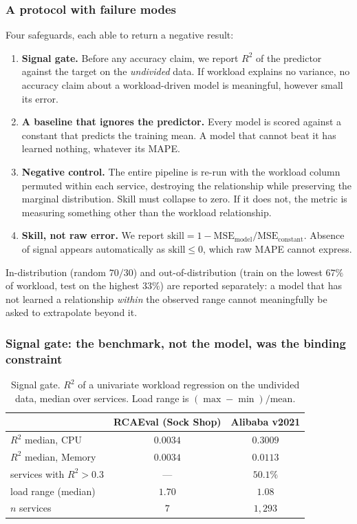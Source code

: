 \documentclass[journal, 10pt]{IEEEtran}
\begin{document}
\subsubsection{A protocol with failure modes}
\label{sec:rq4-protocol}
Four safeguards, each able to return a negative result:

\begin{enumerate}
    \item \textbf{Signal gate.} Before any accuracy claim, we report $R^2$ of the
    predictor against the target on the \emph{undivided} data. If workload
    explains no variance, no accuracy claim about a workload-driven model is
    meaningful, however small its error.
    \item \textbf{A baseline that ignores the predictor.} Every model is scored
    against a constant that predicts the training mean. A model that cannot beat
    it has learned nothing, whatever its MAPE.
    \item \textbf{Negative control.} The entire pipeline is re-run with the
    workload column permuted within each service, destroying the relationship
    while preserving the marginal distribution. Skill must collapse to zero. If
    it does not, the metric is measuring something other than the workload
    relationship.
    \item \textbf{Skill, not raw error.} We report
    $\mathrm{skill} = 1 - \mathrm{MSE}_{\text{model}}/\mathrm{MSE}_{\text{constant}}$.
    Absence of signal appears automatically as $\mathrm{skill}\leq 0$, which raw
    MAPE cannot express.
\end{enumerate}

In-distribution (random $70/30$) and out-of-distribution (train on the lowest
$67\%$ of workload, test on the highest $33\%$) are reported separately: a model
that has not learned a relationship \emph{within} the observed range cannot
meaningfully be asked to extrapolate beyond it.

\subsubsection{Signal gate: the benchmark, not the model, was the binding constraint}
\label{sec:rq4-gate}

\begin{table}[!t]
\centering
\caption{Signal gate. $R^2$ of a univariate workload regression on the undivided
data, median over services. Load range is $(\max-\min)/\mathrm{mean}$.}
\label{tab:signal-gate}
\begin{tabular}{lcc}
\toprule
 & RCAEval (Sock Shop) & Alibaba v2021 \\
\midrule
$R^2$ median, CPU     & $0.0034$ & $\mathbf{0.3009}$ \\
$R^2$ median, Memory  & $0.0034$ & $0.0113$ \\
services with $R^2>0.3$ & --- & $\mathbf{50.1\%}$ \\
load range (median)   & $1.70$ & $1.08$ \\
$n$ services          & $7$ & $1{,}293$ \\
\bottomrule
\end{tabular}
\end{table}
\end{document}
